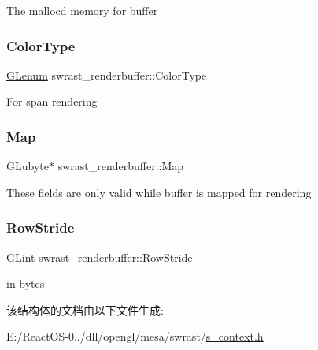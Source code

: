 The malloc\textquotesingle{}d memory for buffer \mbox{\label{structswrast__renderbuffer_a6e26ee9a792adc67a479573884e58aee}} 
\subsubsection{\texorpdfstring{Color\+Type}{ColorType}}
{\footnotesize\ttfamily \hyperlink{interfacevoid}{G\+Lenum} swrast\+\_\+renderbuffer\+::\+Color\+Type}

For span rendering \mbox{\label{structswrast__renderbuffer_a1e4aa5c61a3b986351d31b44f66dfd51}} 
\subsubsection{\texorpdfstring{Map}{Map}}
{\footnotesize\ttfamily G\+Lubyte$\ast$ swrast\+\_\+renderbuffer\+::\+Map}

These fields are only valid while buffer is mapped for rendering \mbox{\label{structswrast__renderbuffer_abc1ea97c94b96dd4cf54ee4c946662e8}} 
\subsubsection{\texorpdfstring{Row\+Stride}{RowStride}}
{\footnotesize\ttfamily G\+Lint swrast\+\_\+renderbuffer\+::\+Row\+Stride}

in bytes 

该结构体的文档由以下文件生成\+:\begin{DoxyCompactItemize}
\item 
E\+:/\+React\+O\+S-\/0../dll/opengl/mesa/swrast/\hyperlink{s__context_8h}{s\+\_\+context.\+h}\end{DoxyCompactItemize}
